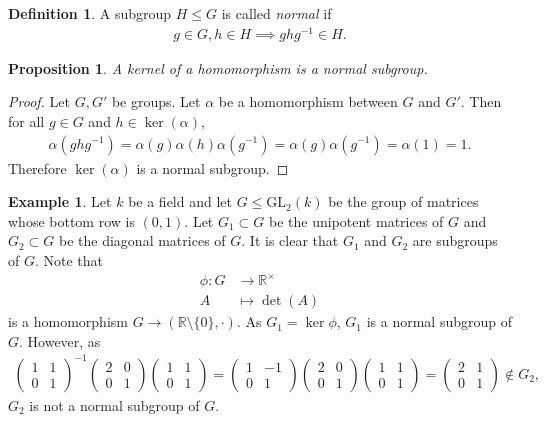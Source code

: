 \documentclass[12pt]{report}
\theoremstyle{plain}
\newtheorem{proposition}[theorem]{Proposition}
\theoremstyle{remark}
\theoremstyle{definition}
\newtheorem{definition}[theorem]{Definition}
\newtheorem{example}[theorem]{Example}
\newcommand{\R}{\mathbb{R}}
\begin{document}
\begin{definition}
    A subgroup $H\le G$ is called \emph{normal} if
    \begin{align*}
        g\in G,h\in H\implies ghg^{-1}\in H.
    \end{align*}
\end{definition}

\begin{proposition}
    A kernel of a homomorphism is a normal subgroup.
\end{proposition}
\begin{proof}
    Let $G, G'$ be groups. Let $\alpha$ be a homomorphism between $G$ and $G'$. Then for all $g\in G$ and $h\in\ker(\alpha)$,
    \begin{align*}
        \alpha(ghg^{-1}) = \alpha(g)\alpha(h)\alpha(g^{-1}) = \alpha(g)\alpha(g^{-1}) = \alpha(1) = 1.
    \end{align*}
    Therefore $\ker(\alpha)$ is a normal subgroup.
\end{proof}

\begin{example}
    Let $k$ be a field and let $G\le \mathrm{GL}_2(k)$ be the group of matrices whose bottom row is $(0,1)$. Let $G_1\subset G$ be the unipotent matrices of $G$ and $G_2\subset G$ be the diagonal matrices of $G$. It is clear that $G_1$ and $G_2$ are subgroups of $G$. Note that
    \begin{align*}
        \phi:G&\rightarrow \R^\times \\
        A &\mapsto \det(A)
    \end{align*}
    is a homomorphism $G\rightarrow (\R\setminus\{0\},\cdot)$. As $G_1=\ker \phi$, $G_1$ is a normal subgroup of $G$. However, as
    \begin{align*}
        \begin{pmatrix}
            1 & 1 \\ 0 & 1
        \end{pmatrix}^{-1} \begin{pmatrix}
            2 & 0 \\ 0 & 1
        \end{pmatrix} \begin{pmatrix}
            1 & 1 \\ 0 & 1
        \end{pmatrix} = \begin{pmatrix}
            1 & -1 \\ 0 & 1
        \end{pmatrix} \begin{pmatrix}
            2 & 0 \\ 0 & 1
        \end{pmatrix} \begin{pmatrix}
            1 & 1 \\ 0 & 1
        \end{pmatrix} = \begin{pmatrix}
            2 & 1 \\ 0 & 1
        \end{pmatrix}\notin G_2,
    \end{align*}
    $G_2$ is not a normal subgroup of $G$.
\end{example}
\end{document}
